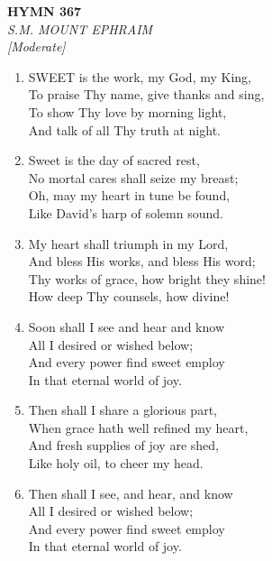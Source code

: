 \documentclass[11pt,a4paper]{article}
\begin{document}
\newpage
\begin{center}
    {\Large \textbf{HYMN 367}}
    \\
    \textit{S.M. MOUNT EPHRAIM}
    \\
    \textit{\small [Moderate]}
\end{center}
\vspace{1em}

\begin{enumerate}
    \item SWEET is the work, my God, my King, \\
        To praise Thy name, give thanks and sing, \\
        To show Thy love by morning light, \\
        And talk of all Thy truth at night.

    \item Sweet is the day of sacred rest, \\
        No mortal cares shall seize my breast; \\
        Oh, may my heart in tune be found, \\
        Like David's harp of solemn sound.

    \item My heart shall triumph in my Lord, \\
        And bless His works, and bless His word; \\
        Thy works of grace, how bright they shine! \\
        How deep Thy counsels, how divine!

    \item Soon shall I see and hear and know \\
        All I desired or wished below; \\
        And every power find sweet employ \\
        In that eternal world of joy.

    \item Then shall I share a glorious part, \\
        When grace hath well refined my heart, \\
        And fresh supplies of joy are shed, \\
        Like holy oil, to cheer my head.

    \item Then shall I see, and hear, and know \\
        All I desired or wished below; \\
        And every power find sweet employ \\
        In that eternal world of joy.

\end{enumerate}
\end{document}
